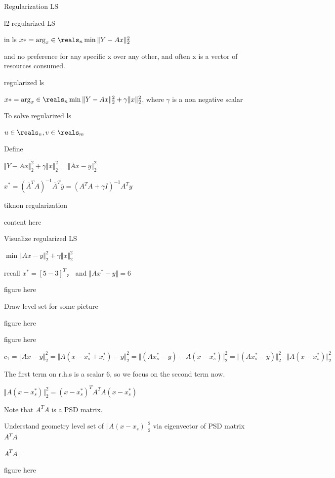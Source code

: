 Regularization LS

l2 regularized LS

in ls $x*=\arg_x\in\reals_{n} \min \Vert Y-Ax\Vert ^2_2$

and no preference for any specific x over any other, and often x is a vector of resources consumed.

regularized ls

$x*=\arg_x\in\reals_{n} \min \Vert Y-Ax\Vert ^2_2 + \gamma \Vert x\Vert ^2_2$, where $\gamma$ is a non negative scalar


To solve regularized ls

$u\in\reals_{n}, v\in\reals_{m}$


Define


$\Vert Y-Ax\Vert ^2_2 + \gamma \Vert x\Vert ^2_2=\Vert \bar{A}x-\bar{y}\Vert^2_2$

$x^*=(\bar{A}^TA)^{-1}\bar{A}^T\bar{y}=(A^TA+\gamma I)^{-1}A^Ty$


tiknon regularization

content here


Visualize regularized LS

$\min \Vert Ax-y\Vert_2^2 +\gamma\Vert x\Vert^2_2$

recall $x^*=[5 -3]^T$， and $\Vert Ax^*-y\Vert = 6$

figure here


Draw level set for some picture

figure here

figure here



$c_1=\Vert Ax-y\Vert^2_2=\Vert A(x-x_s^*+x_s^*)-y\Vert^2_2=\Vert (Ax_s^*-y)-A(x-x_s^*)\Vert^2_2=\Vert (Ax_s^*-y)\Vert^2_2 - \Vert A(x-x_s^*)\Vert^2_2$

The first term on r.h.s is a scalar 6, so we focus on the second term now.

$\Vert A(x-x_s^*)\Vert^2_2= (x-x_s^*)^T A^TA (x-x_s^*)$ 

Note that $A^TA$ is a PSD matrix.


Understand geometry level set of $\Vert A(x-x_s)\Vert^2_2$ via eigenvector of PSD matrix $A^TA$


$A^TA=$

figure here

















